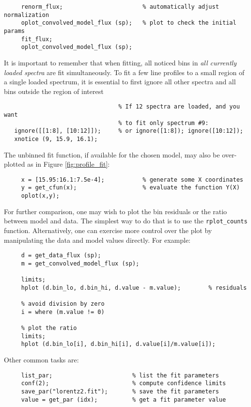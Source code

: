 \documentclass{book}
\begin{document}
{\begin{enumerate}
     \begin{verbatim}
     renorm_flux;                       % automatically adjust normalization
     oplot_convolved_model_flux (sp);   % plot to check the initial params
     fit_flux;
     oplot_convolved_model_flux (sp);
     \end{verbatim}

It is important to remember that when fitting, all noticed bins in {\it all
currently loaded spectra} are fit simultaneously. To fit a few line profiles
to a small region of a single loaded spectrum, it is essential to first
ignore all other spectra and all bins outside the region of interest
\begin{verbatim}
                                 % If 12 spectra are loaded, and you want
                                 % to fit only spectrum #9:
   ignore([[1:8], [10:12]]);     % or ignore([1:8]); ignore([10:12]);
   xnotice (9, 15.9, 16.1);
\end{verbatim}

The unbinned fit function, if available for the
chosen model, may also be over-plotted as in Figure \ref{fig:profile_fit}:

     \begin{verbatim}
     x = [15.95:16.1:7.5e-4];           % generate some X coordinates
     y = get_cfun(x);                   % evaluate the function Y(X)
     oplot(x,y);
     \end{verbatim}

For further comparison, one may wish to plot the bin residuals or the ratio
between model and data.  The simplest way to do that is to use
the \verb|rplot_counts| function.  Alternatively,
one can exercise more control over the plot by
manipulating the data and model values directly.
For example:

     \begin{verbatim}
     d = get_data_flux (sp);
     m = get_convolved_model_flux (sp);

     limits;
     hplot (d.bin_lo, d.bin_hi, d.value - m.value);        % residuals

     % avoid division by zero
     i = where (m.value != 0)

     % plot the ratio
     limits;
     hplot (d.bin_lo[i], d.bin_hi[i], d.value[i]/m.value[i]);
     \end{verbatim}

Other common tasks are:

     \begin{verbatim}
     list_par;                       % list the fit parameters
     conf(2);                        % compute confidence limits
     save_par("lorentz2.fit");       % save the fit parameters
     value = get_par (idx);          % get a fit parameter value
     \end{verbatim}


\end{enumerate}}
\end{document}

